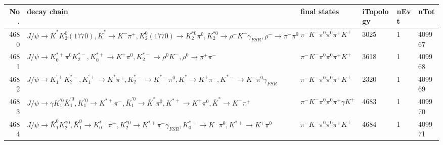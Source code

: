 \begin{table}[htbp] 
\begin{center}
\begin{small}
\begin{tabular}{rlllll}\hline\hline
 No. & decay chain & final states &  iTopology & nEvt & nTot \\\hline
4680&$J/\psi       \rightarrow \bar{K}^{*}   K_2^0(1770)    , \bar{K}^{*}    \rightarrow K^{-}          \pi^{+}        , K_2^0(1770)     \rightarrow K_2^{*0}       \pi^{0}        , K_2^{*0}        \rightarrow \rho^{-}      K^{+}          \gamma_{FSR} , \rho^{-}       \rightarrow \pi^{-}        \pi^{0}        $&$\pi^{-}        K^{-}          \pi^{0}        \pi^{0}        \pi^{+}        K^{+}          $& 3025&    1&409967\\
4681&$J/\psi       \rightarrow K_{0}^{*+}     \pi^{0}        K_2^{*-}       , K_{0}^{*+}      \rightarrow K^{+}          \pi^{0}        , K_2^{*-}        \rightarrow \rho^{0}      K^{-}          , \rho^{0}       \rightarrow \pi^{+}        \pi^{-}        $&$\pi^{-}        K^{-}          \pi^{0}        \pi^{0}        \pi^{+}        K^{+}          $& 3618&    1&409968\\
4682&$J/\psi       \rightarrow K_1^{'+}      K_2^{*-}       , K_1^{'+}       \rightarrow K^{*}          \pi^{+}        , K_2^{*-}        \rightarrow K^{*-}         \pi^{0}        , K^{*}           \rightarrow K^{+}          \pi^{-}        , K^{*-}          \rightarrow K^{-}          \pi^{0}        \gamma_{FSR} $&$\pi^{-}        K^{-}          \pi^{0}        \pi^{0}        \pi^{+}        K^{+}          $& 2320&    1&409969\\
4683&$J/\psi       \rightarrow \gamma       K_1^{'0}      \bar{K}_1^{'0}, K_1^{'0}       \rightarrow K^{*+}         \pi^{-}        , \bar{K}_1^{'0} \rightarrow \bar{K}^{*}   \pi^{0}        , K^{*+}          \rightarrow K^{+}          \pi^{0}        , \bar{K}^{*}    \rightarrow K^{-}          \pi^{+}        $&$\pi^{-}        K^{-}          \pi^{0}        \pi^{0}        \pi^{+}        \gamma       K^{+}          $& 4683&    1&409970\\
4684&$J/\psi       \rightarrow \bar{K}_1^{0} K_2^{*0}       , \bar{K}_1^{0}  \rightarrow K_{0}^{*-}     \pi^{+}        , K_2^{*0}        \rightarrow K^{*+}         \pi^{-}        \gamma_{FSR} , K_{0}^{*-}      \rightarrow K^{-}          \pi^{0}        , K^{*+}          \rightarrow K^{+}          \pi^{0}        $&$\pi^{-}        K^{-}          \pi^{0}        \pi^{0}        \pi^{+}        K^{+}          $& 4684&    1&409971\\

\end{tabular}
\end{small}
\end{center}
\end{table}
